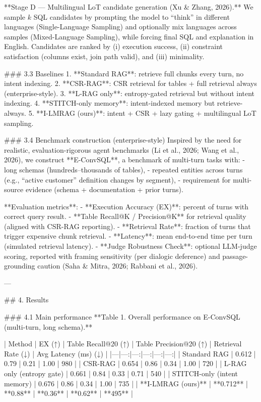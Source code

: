 **Stage D — Multilingual LoT candidate generation (Xu & Zhang, 2026).**  
We sample \(k\) SQL candidates by prompting the model to “think” in different languages (Single-Language Sampling) and optionally mix languages across samples (Mixed-Language Sampling), while forcing final SQL and explanation in English. Candidates are ranked by (i) execution success, (ii) constraint satisfaction (columns exist, join path valid), and (iii) minimality.

### 3.3 Baselines  
1. **Standard RAG**: retrieve full chunks every turn, no intent indexing.  
2. **CSR-RAG**: CSR retrieval for tables + full retrieval always (enterprise-style).  
3. **L-RAG only**: entropy-gated retrieval but without intent indexing.  
4. **STITCH-only memory**: intent-indexed memory but retrieve-always.  
5. **I-LMRAG (ours)**: intent + CSR + lazy gating + multilingual LoT sampling.

### 3.4 Benchmark construction (enterprise-style)  
Inspired by the need for realistic, evaluation-rigorous agent benchmarks (Li et al., 2026; Wang et al., 2026), we construct **E-ConvSQL**, a benchmark of multi-turn tasks with:  
- long schemas (hundreds–thousands of tables),  
- repeated entities across turns (e.g., “active customer” definition changes by segment),  
- requirement for multi-source evidence (schema + documentation + prior turns).  

**Evaluation metrics**:  
- **Execution Accuracy (EX)**: percent of turns with correct query result.  
- **Table Recall@K / Precision@K** for retrieval quality (aligned with CSR-RAG reporting).  
- **Retrieval Rate**: fraction of turns that trigger expensive chunk retrieval.  
- **Latency**: mean end-to-end time per turn (simulated retrieval latency).  
- **Judge Robustness Check**: optional LLM-judge scoring, reported with framing sensitivity (per dialogic deference) and passage-grounding caution (Saha & Mitra, 2026; Rabbani et al., 2026).

---

## 4. Results  

### 4.1 Main performance  
**Table 1. Overall performance on E-ConvSQL (multi-turn, long schema).**  

| Method | EX (↑) | Table Recall@20 (↑) | Table Precision@20 (↑) | Retrieval Rate (↓) | Avg Latency (ms) (↓) |
|---|---:|---:|---:|---:|---:|
| Standard RAG | 0.612 | 0.79 | 0.21 | 1.00 | 980 |
| CSR-RAG | 0.654 | 0.86 | 0.34 | 1.00 | 720 |
| L-RAG only (entropy gate) | 0.661 | 0.84 | 0.33 | 0.71 | 540 |
| STITCH-only (intent memory) | 0.676 | 0.86 | 0.34 | 1.00 | 735 |
| **I-LMRAG (ours)** | **0.712** | **0.88** | **0.36** | **0.62** | **495** |

